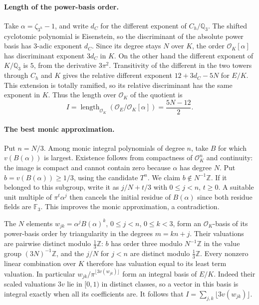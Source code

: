 \documentclass[11pt]{article}
\begin{document}
\paragraph{Length of the power-basis order.}
Take $\alpha=\zeta_{3^h}-1$, and write $d_C$ for the
different exponent of $C_h/\mathbb Q_3$. The shifted cyclotomic
polynomial is Eisenstein, so the discriminant of the absolute power
basis has $3$-adic exponent $d_C$. Since its degree stays $N$ over
$K$, the order $\mathcal O_K[\alpha]$ has discriminant exponent
$3d_C$ in $K$. On the other hand the different exponent of
$K/\mathbb Q_3$ is $5$, from the derivative $3\pi^2$. Transitivity
of the different in the two towers through $C_h$ and $K$ gives the
relative different exponent $12+3d_C-5N$ for $E/K$. This extension
is totally ramified, so its relative discriminant has the same
exponent in $K$. Thus the length over $\mathcal O_K$ of the quotient is
\[
 I=\operatorname{length}_{\mathcal O_K}(\mathcal O_E/\mathcal O_K[\alpha])
   =\frac{5N-12}{2}.                                             \tag{2}
\]

\paragraph{The best monic approximation.}
Put $n=N/3$. Among monic integral polynomials of degree $n$, take
$B$ for which $v(B(\alpha))$ is largest. Existence follows from compactness
of $\mathcal O_K^n$ and continuity: the image is compact and cannot contain
zero because $\alpha$ has degree $N$. Put $b=v(B(\alpha))\ge1/3$, using
the candidate $T^n$. We claim $b\notin N^{-1}\mathbb Z$. If it belonged
to this subgroup, write it as $j/N+t/3$ with $0\le j<n$, $t\ge0$.
A suitable unit multiple of $\pi^t\alpha^j$ then cancels the initial
residue of $B(\alpha)$ since both residue fields are $\mathbb F_3$.
This improves the monic approximation, a contradiction.

The $N$ elements $w_{jk}=\alpha^jB(\alpha)^k$,
$0\le j<n$, $0\le k<3$, form an $\mathcal O_K$-basis of its power-basis
order by triangularity in the degrees $m=kn+j$. Their valuations
are pairwise distinct modulo $\tfrac13\mathbb Z$: $b$ has order
three modulo $N^{-1}\mathbb Z$ in the value group $(3N)^{-1}\mathbb Z$,
and the $j/N$ for $j<n$ are distinct modulo $\tfrac13\mathbb Z$.
Every nonzero linear combination over $K$ therefore has valuation
equal to its least term valuation. In particular
$w_{jk}/\pi^{\lfloor3v(w_{jk})\rfloor}$ form an integral basis
of $E/K$. Indeed their scaled valuations $3v$ lie in $[0,1)$ in distinct
classes, so a vector in this basis is integral exactly when all its
coefficients are. It follows that
$I=\sum_{j,k}\lfloor3v(w_{jk})\rfloor$.
\end{document}
